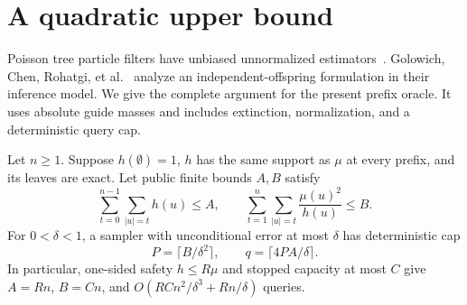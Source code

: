 \section{A quadratic upper bound}\label{app:branching}
Poisson tree particle filters have unbiased unnormalized estimators~\cite[Section 3 and Proposition 4.1]{poisson}. Golowich, Chen, Rohatgi, et al.~\cite[Appendix E]{rrr} analyze an independent-offspring formulation in their inference model. We give the complete argument for the present prefix oracle. It uses absolute guide masses and includes extinction, normalization, and a deterministic query cap.

\begin{theorem}\label{thm:branching}
Let $n\ge1$. Suppose $h(\emptyset)=1$, $h$ has the same support as $\mu$ at every prefix, and its leaves are exact. Let public finite bounds $A,B$ satisfy
\begin{equation}\label{eq:branch-moments}
 \sum_{t=0}^{n-1}\sum_{|u|=t}h(u)\le A,
 \qquad
 \sum_{t=1}^n\sum_{|u|=t}\frac{\mu(u)^2}{h(u)}\le B.
\end{equation}
For $0<\delta<1$, a sampler with unconditional error at most $\delta$ has deterministic cap
\begin{equation}\label{eq:branch-cap}
 P=\lceil B/\delta^2\rceil,
 \qquad q=\lceil4PA/\delta\rceil.
\end{equation}
In particular, one-sided safety $h\le R\mu$ and stopped capacity at most $C$ give $A=Rn$, $B=Cn$, and $O(RC n^2/\delta^3+Rn/\delta)$ queries.
\end{theorem}
